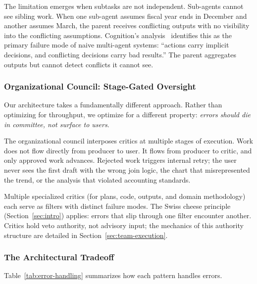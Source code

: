 \documentclass[sigconf]{acmart}
\newcommand{\reviewnote}[1]{}
\newcommand{\reviewnote}[1]{\marginnote{\raggedright\footnotesize\textit{#1}}}
\begin{document}
The limitation emerges when subtasks are not independent. Sub-agents cannot see sibling work. When one sub-agent assumes fiscal year ends in December and another assumes March, the parent receives conflicting outputs with no visibility into the conflicting assumptions. Cognition's analysis~\cite{Cognition2025} identifies this as the primary failure mode of naive multi-agent systems: ``actions carry implicit decisions, and conflicting decisions carry bad results.'' The parent aggregates outputs but cannot detect conflicts it cannot see.

\subsubsection{Organizational Council: Stage-Gated Oversight}

Our architecture takes a fundamentally different approach. Rather than optimizing for throughput, we optimize for a different property: \textit{errors should die in committee, not surface to users}.

The organizational council interposes critics at multiple stages of execution. Work does not flow directly from producer to user. It flows from producer to critic, and only approved work advances. Rejected work triggers internal retry; the user never sees the first draft with the wrong join logic, the chart that misrepresented the trend, or the analysis that violated accounting standards.\reviewnote{Concrete examples strengthen the argument. Add 1-2 specific examples of errors caught at each layer from your traces.}

Multiple specialized critics (for plans, code, outputs, and domain methodology) each serve as filters with distinct failure modes. The Swiss cheese principle (Section~\ref{sec:intro}) applies: errors that slip through one filter encounter another.\reviewnote{Key assumption: failure modes are "misaligned". Verify empirically---show correlation matrix of error types caught by each critic layer.} Critics hold veto authority, not advisory input; the mechanics of this authority structure are detailed in Section~\ref{sec:team-execution}.

\subsubsection{The Architectural Tradeoff}

Table~\ref{tab:error-handling} summarizes how each pattern handles errors.
\end{document}
